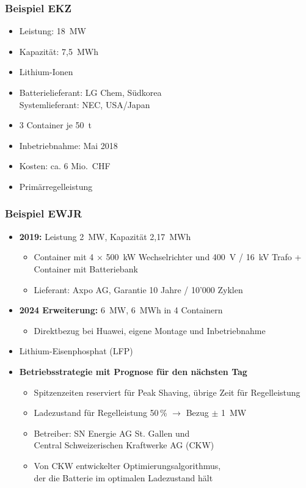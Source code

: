 \subsubsection{Beispiel EKZ}

\begin{itemize}
  \item Leistung: 18~MW
  \item Kapazität: 7{,}5~MWh
  \item Lithium-Ionen
  \item Batterielieferant: LG Chem, Südkorea\\
        Systemlieferant: NEC, USA/Japan
  \item 3 Container je 50~t
  \item Inbetriebnahme: Mai 2018
  \item Kosten: ca. 6 Mio.\ CHF
  \item Primärregelleistung
\end{itemize}



\subsubsection{Beispiel EWJR}

\begin{itemize}
  \item \textbf{2019:} Leistung 2~MW, Kapazität 2{,}17~MWh
  \begin{itemize}
    \item Container mit 4 × 500~kW Wechselrichter und 400~V / 16~kV Trafo + Container mit Batteriebank
    \item Lieferant: Axpo AG, Garantie 10 Jahre / 10'000 Zyklen
  \end{itemize}

  \item \textbf{2024 Erweiterung:} 6~MW, 6~MWh in 4 Containern
  \begin{itemize}
    \item Direktbezug bei Huawei, eigene Montage und Inbetriebnahme
  \end{itemize}

  \item Lithium-Eisenphosphat (LFP)

  \item \textbf{Betriebsstrategie mit Prognose für den nächsten Tag}
  \begin{itemize}
    \item Spitzenzeiten reserviert für Peak Shaving, übrige Zeit für Regelleistung
    \item Ladezustand für Regelleistung 50\,\% $\rightarrow$ Bezug $\pm$ 1~MW
    \item Betreiber: SN Energie AG St. Gallen und\\
          Central Schweizerischen Kraftwerke AG (CKW)
    \item Von CKW entwickelter Optimierungsalgorithmus,\\
          der die Batterie im optimalen Ladezustand hält
  \end{itemize}
\end{itemize}




